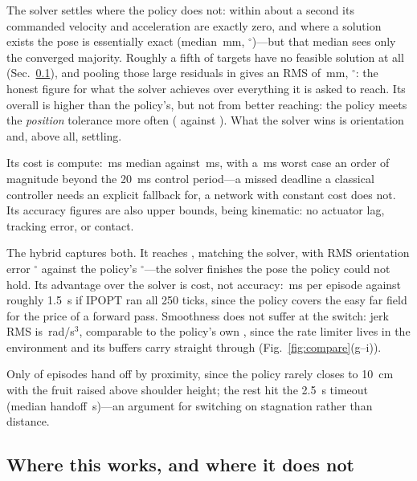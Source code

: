 \documentclass[conference]{IEEEtran}
\begin{document}
The solver settles where the policy does not: within about a second its
commanded velocity and acceleration are exactly zero, and where a solution
exists the pose is essentially exact (median \CASposMedian{}\,mm,
\CASoriMedian{}$^\circ$)---but that median sees only the converged majority.
Roughly a fifth of targets have no feasible solution at all
(Sec.~\ref{sec:limitations}), and pooling those large residuals in gives an
RMS of \CASposRMS{}\,mm, \CASoriRMS{}$^\circ$: the honest figure for what the
solver achieves over everything it is asked to reach. Its overall
\CASfeasible{} is higher than the policy's, but not from better reaching: the
policy meets the \emph{position} tolerance more often (\RESposonly{} against
\CASposfeasible{}). What the solver wins is orientation and, above all,
settling.

Its cost is compute: \CASsolveMed{}\,ms median against \RLforward{}\,ms, with a
\CASsolveMax{}\,ms worst case an order of magnitude beyond the
\SI{20}{\milli\second} control period---a missed deadline a classical
controller needs an explicit fallback for, a network with constant cost does
not. Its accuracy figures are also upper bounds, being kinematic: no actuator
lag, tracking error, or contact.

The hybrid captures both. It reaches \HYBsuccess{}, matching the solver, with
RMS orientation error \HYBtheta{}$^\circ$ against the policy's
\RESthetafinal{}$^\circ$---the solver finishes the pose the policy could not
hold. Its advantage over the solver is cost, not accuracy: \HYBcompute{}\,ms
per episode against roughly \SI{1.5}{\second} if IPOPT ran all 250 ticks,
since the policy covers the easy far field for the price of a forward pass.
Smoothness does not suffer at the switch: jerk RMS is \HYBjerk{}\,rad/s$^3$,
comparable to the policy's own \RESjerkOn{}, since the rate limiter lives in
the environment and its buffers carry straight through (Fig.~\ref{fig:compare}(g--i)).

Only \HYBbyprox{} of episodes hand off by proximity, since the policy rarely
closes to \SI{10}{\centi\metre} with the fruit raised above shoulder height;
the rest hit the \SI{2.5}{\second} timeout (median handoff \HYBhandoff{}\,s)---an
argument for switching on stagnation rather than distance.

\subsection{Where this works, and where it does not}
\label{sec:limitations}
\end{document}
